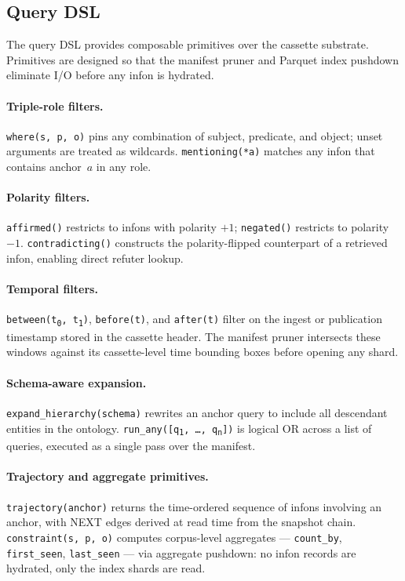 \subsection{Query DSL}
\label{sec:architecture:dsl}

The query DSL provides composable primitives over the cassette substrate.
Primitives are designed so that the manifest pruner and Parquet index pushdown
eliminate I/O before any infon is hydrated.

\paragraph{Triple-role filters.}
\texttt{where(s, p, o)} pins any combination of subject, predicate, and object;
unset arguments are treated as wildcards.  \texttt{mentioning(*a)} matches any
infon that contains anchor~$a$ in any role.

\paragraph{Polarity filters.}
\texttt{affirmed()} restricts to infons with polarity $+1$; \texttt{negated()}
restricts to polarity $-1$.  \texttt{contradicting()} constructs the
polarity-flipped counterpart of a retrieved infon, enabling direct refuter
lookup.

\paragraph{Temporal filters.}
\texttt{between(t\textsubscript{0}, t\textsubscript{1})}, \texttt{before(t)},
and \texttt{after(t)} filter on the ingest or publication timestamp stored in
the cassette header.  The manifest pruner intersects these windows against its
cassette-level time bounding boxes before opening any shard.

\paragraph{Schema-aware expansion.}
\texttt{expand\_hierarchy(schema)} rewrites an anchor query to include all
descendant entities in the ontology.  \texttt{run\_any([q\textsubscript{1},
\ldots, q\textsubscript{n}])} is logical OR across a list of queries, executed
as a single pass over the manifest.

\paragraph{Trajectory and aggregate primitives.}
\texttt{trajectory(anchor)} returns the time-ordered sequence of infons
involving an anchor, with NEXT edges derived at read time from the snapshot
chain.  \texttt{constraint(s, p, o)} computes corpus-level aggregates ---
\texttt{count\_by}, \texttt{first\_seen}, \texttt{last\_seen} --- via
aggregate pushdown: no infon records are hydrated, only the index shards are
read.


